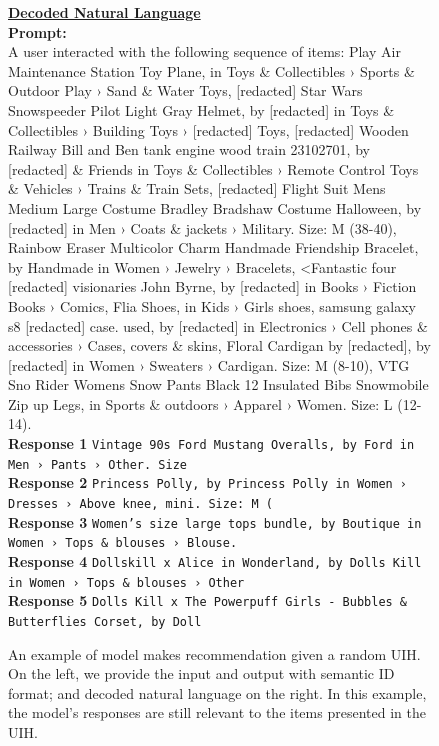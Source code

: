\documentclass[]{fairmeta}
\begin{document}
\begin{figure}[H]
\begin{tcolorbox}[title={\textbf{Case Study: Recommendation given a Random UIH}},
                    colback=white, colframe=black!70]
  \hfill
  \begin{minipage}[t]{0.48\textwidth}
  \textbf{\underline{Decoded Natural Language}}\\[0.5em]
  \textbf{Prompt:}\\
  {\footnotesize A user interacted with the following sequence of items: Play Air Maintenance Station Toy Plane, in Toys \& Collectibles › Sports \& Outdoor Play › Sand \& Water Toys, [redacted] Star Wars Snowspeeder Pilot Light Gray Helmet, by [redacted] in Toys \& Collectibles › Building Toys › [redacted] Toys, [redacted] Wooden Railway Bill and Ben tank engine wood train 23102701, by [redacted] \& Friends in Toys \& Collectibles › Remote Control Toys \& Vehicles › Trains \& Train Sets, [redacted] Flight Suit Mens Medium Large Costume Bradley Bradshaw Costume Halloween, by [redacted] in Men › Coats \& jackets › Military. Size: M (38-40), Rainbow Eraser Multicolor Charm Handmade Friendship Bracelet, by Handmade in Women › Jewelry › Bracelets, <Fantastic four [redacted] visionaries John Byrne, by [redacted] in Books › Fiction Books › Comics, Flia Shoes, in Kids › Girls shoes, samsung galaxy s8 [redacted] case. used, by [redacted] in Electronics › Cell phones \& accessories › Cases, covers \& skins, Floral Cardigan by [redacted], by [redacted] in Women › Sweaters › Cardigan. Size: M (8-10), VTG Sno Rider Womens Snow Pants Black 12 Insulated Bibs Snowmobile Zip up Legs, in Sports \& outdoors › Apparel › Women. Size: L (12-14).}\\[0.3em]
  \textbf{Response 1} {\footnotesize\texttt{Vintage 90s Ford Mustang Overalls, by Ford in Men › Pants › Other. Size}}\\
  \textbf{Response 2} {\footnotesize\texttt{Princess Polly, by Princess Polly in Women › Dresses › Above knee, mini. Size: M (}}\\
  \textbf{Response 3} {\footnotesize\texttt{Women’s size large tops bundle, by Boutique in Women › Tops \& blouses › Blouse.}}\\
  \textbf{Response 4} {\footnotesize\texttt{Dollskill x Alice in Wonderland, by Dolls Kill in Women › Tops \& blouses › Other}}\\
  \textbf{Response 5} {\footnotesize\texttt{Dolls Kill x The Powerpuff Girls - Bubbles \& Butterflies Corset, by Doll}}\\
  \end{minipage}
  \end{tcolorbox}
  \caption{An example of model makes recommendation given a random UIH. On the left, we provide the input and output with semantic ID format; and decoded natural language on the right. In this example, the model's responses are still relevant to the items presented in the UIH.}\label{case:random_uih}
  \end{figure}
\end{document}

